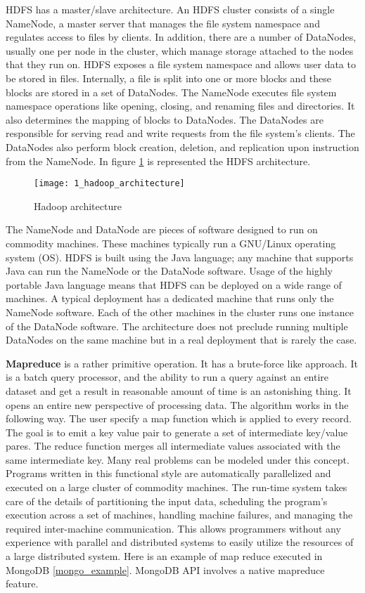 HDFS has a master/slave architecture. An HDFS cluster consists of a single NameNode, a master server that manages the file system namespace and regulates access to files by clients. In addition, there are a number of DataNodes, usually one per node in the cluster, which manage storage attached to the nodes that they run on. HDFS exposes a file system namespace and allows user data to be stored in files. Internally, a file is split into one or more blocks and these blocks are stored in a set of DataNodes. The NameNode executes file system namespace operations like opening, closing, and renaming files and directories. It also determines the mapping of blocks to DataNodes. The DataNodes are responsible for serving read and write requests from the file system’s clients. The DataNodes also perform block creation, deletion, and replication upon instruction from the NameNode. In figure \ref{hadoop_architecture} is represented the HDFS architecture.

\begin{figure}[!ht]
\centering
\texttt{[image: 1\_hadoop\_architecture]}
\caption{Hadoop architecture \cite{data_mining_image}}\label{hadoop_architecture}
\end{figure}

The NameNode and DataNode are pieces of software designed to run on commodity machines. These machines typically run a GNU/Linux operating system (OS). HDFS is built using the Java language; any machine that supports Java can run the NameNode or the DataNode software. Usage of the highly portable Java language means that HDFS can be deployed on a wide range of machines. A typical deployment has a dedicated machine that runs only the NameNode software. Each of the other machines in the cluster runs one instance of the DataNode software. The architecture does not preclude running multiple DataNodes on the same machine but in a real deployment that is rarely the case.

\textbf{Mapreduce} is a rather primitive operation. It has a brute-force like approach. It is a batch query processor, and the ability to run a query against an entire dataset and get a result in reasonable amount of time is an astonishing thing. It opens an entire new perspective of processing data. The algorithm works in the following way. The user specify a map function which is applied to every record. The goal is to emit a key value pair to generate a set of intermediate key/value pares. The reduce function merges all intermediate values associated with the same intermediate key. Many real problems can be modeled under this concept. Programs written in this functional style are automatically parallelized and executed on a large cluster of commodity machines. The run-time system takes care of the details of partitioning the input data, scheduling the program's execution across a set of machines, handling machine failures, and managing the required inter-machine communication. This allows programmers without any experience with parallel and distributed systems to easily utilize the resources of a large distributed system. Here is an example of map reduce executed in MongoDB \ref{mongo_example}. MongoDB API involves a native mapreduce feature.

